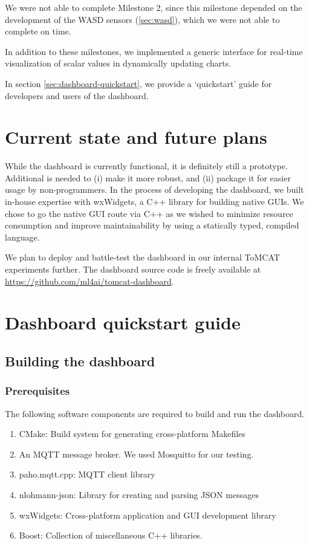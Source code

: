We were not able to complete Milestone 2, since this milestone depended on the
development of the WASD sensors (\autoref{sec:wasd}), which we were not able to
complete on time.

In addition to these milestones, we implemented a generic interface for
real-time visualization of scalar values in dynamically updating charts.

In section \autoref{sec:dashboard-quickstart}, we provide a `quickstart' guide
for developers and users of the dashboard.

\section{Current state and future plans}

While the dashboard is currently functional, it is definitely still a
prototype. Additional is needed to (i) make it more robust, and (ii) package it
for easier usage by non-programmers. In the process of developing the
dashboard, we built in-house expertise with wxWidgets, a C++ library for
building native GUIs. We chose to go the native GUI route via C++ as we wished
to minimize resource consumption and improve maintainability by using a
statically typed, compiled language.

We plan to deploy and battle-test the dashboard in our internal ToMCAT
experiments further. The dashboard source code is freely available at
\url{https://github.com/ml4ai/tomcat-dashboard}.

\section{Dashboard quickstart guide}
\label{sec:dashboard-quickstart}

\subsection{Building the dashboard}

\subsubsection{Prerequisites}

The following software components are required to build and run the dashboard.

\begin{enumerate}
    \item CMake: Build system for generating cross-platform Makefiles
    \item An MQTT message broker. We used Mosquitto for our testing.
    \item paho.mqtt.cpp: MQTT client library 
    \item nlohmann-json: Library for creating and parsing JSON messages
    \item wxWidgets: Cross-platform application and GUI development library
    \item Boost: Collection of miscellaneous C++ libraries.
\end{enumerate}


